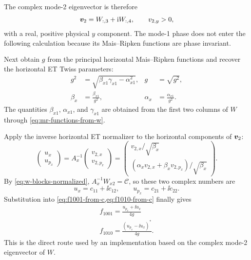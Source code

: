 The complex mode-2 eigenvector is therefore
\begin{equation}
 \bm{v}_2=W_{:,3}+\mathrm{i} W_{:,4},
 \qquad v_{2,y}>0,
 \label{eq:v2-et-phase-gauge}
\end{equation}
with a real, positive physical $y$ component.  The mode-1 phase does not enter
the following calculation because its Mais--Ripken functions are phase invariant.

Next obtain $g$ from the principal horizontal Mais--Ripken functions and recover the
horizontal ET Twiss parameters:
\begin{align}
 g^2
 &=\sqrt{\beta_{x1}\gamma_{x1}-\alpha_{x1}^2},
 &g&=\sqrt{g^2},
 \label{eq:direct-g-from-w}\\
 \beta_x&=\frac{\beta_{x1}}{g^2},
 &\alpha_x&=\frac{\alpha_{x1}}{g^2}.
 \label{eq:direct-et-twiss-from-w}
\end{align}
The quantities $\beta_{x1}$, $\alpha_{x1}$, and $\gamma_{x1}$ are obtained
from the first two columns of $W$ through
\cref{eq:mr-functions-from-w}.

Apply the inverse horizontal ET normalizer to the horizontal components of
$\bm{v}_2$:
\begin{equation}
 \begin{pmatrix}u_x\\u_{p_x}\end{pmatrix}
 =A_x^{-1}
 \begin{pmatrix}v_{2,x}\\v_{2,p_x}\end{pmatrix}
 =\begin{pmatrix}
  v_{2,x}/\sqrt{\beta_x}\\[0.3em]
  (\alpha_xv_{2,x}+\beta_xv_{2,p_x})/\sqrt{\beta_x}
 \end{pmatrix}.
 \label{eq:direct-normalized-v2}
\end{equation}
By \cref{eq:w-blocks-normalized}, $A_x^{-1}W_{x2}=\mathcal C$, so these two
complex numbers are
\begin{equation}
 u_x=c_{11}+\ii c_{12},
 \qquad
 u_{p_x}=c_{21}+\ii c_{22}.
 \label{eq:direct-c-rows}
\end{equation}
Substitution into \cref{eq:f1001-from-c,eq:f1010-from-c} finally gives
\begin{align}
 \boxed{
 f_{1001}=\frac{u_{p_x}+\ii u_x}{4g}
 }
 \label{eq:direct-f1001-from-w}\\
 \boxed{
 f_{1010}=\frac{(u_{p_x}-\ii u_x)^{*}}{4g}.
 }
 \label{eq:direct-f1010-from-w}
\end{align}
This is the direct route used by an implementation based on the complex
mode-2 eigenvector of $W$.
